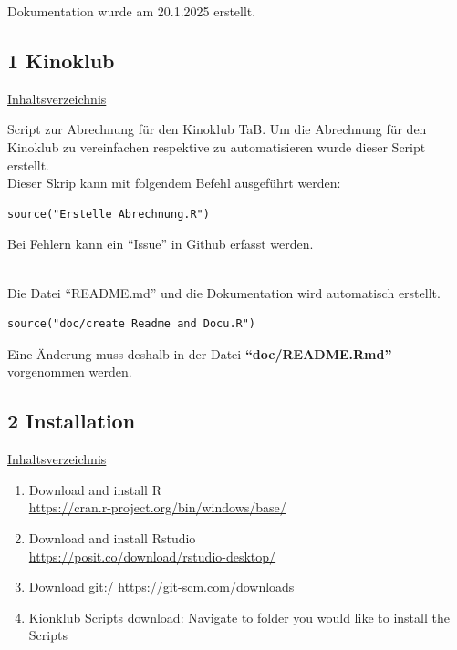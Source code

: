 \documentclass[
]{article}
\providecommand{\tightlist}{%
  \setlength{\itemsep}{0pt}\setlength{\parskip}{0pt}}
\begin{document}
Dokumentation wurde am 20.1.2025 erstellt.

\newpage

\subsection{1 Kinoklub}\label{kinoklub}

\hyperref[Inhaltsverzeichnis]{Inhaltsverzeichnis}

Script zur Abrechnung für den Kinoklub TaB. Um die Abrechnung für den
Kinoklub zu vereinfachen respektive zu automatisieren wurde dieser
Script erstellt.\\
Dieser Skrip kann mit folgendem Befehl ausgeführt werden:

\begin{verbatim}
source("Erstelle Abrechnung.R")
\end{verbatim}

\hfill\break
Bei Fehlern kann ein ``Issue'' in Github erfasst werden.\\
\strut \\
Die Datei ``README.md'' und die Dokumentation wird automatisch erstellt.

\begin{verbatim}
source("doc/create Readme and Docu.R")
\end{verbatim}

Eine Änderung muss deshalb in der Datei \textbf{``doc/README.Rmd''}
vorgenommen werden.

\newpage

\subsection{2 Installation}\label{installation}

\hyperref[Inhaltsverzeichnis]{Inhaltsverzeichnis}

\begin{enumerate}
\def\labelenumi{\arabic{enumi}.}
\tightlist
\item
  Download and install R\\
  \url{https://cran.r-project.org/bin/windows/base/}
\item
  Download and install Rstudio\\
  \url{https://posit.co/download/rstudio-desktop/}
\item
  Download \url{git:/} \url{https://git-scm.com/downloads}
\item
  Kionklub Scripts download: Navigate to folder you would like to
  install the Scripts
\end{enumerate}
\end{document}

